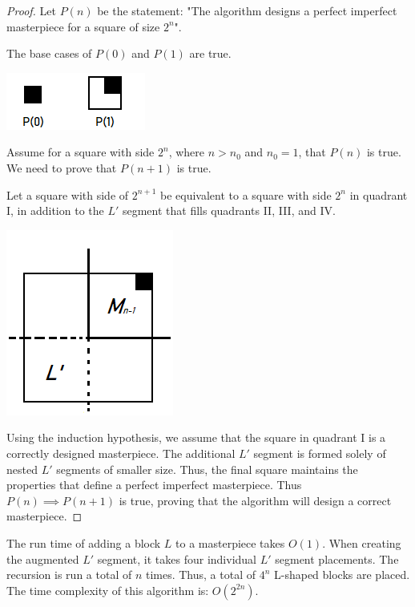 \documentclass[11pt]{article}
\theoremstyle{definition}
\theoremstyle{plain}
\theoremstyle{indented-remark}
\theoremstyle{indented-proof}
\begin{document}
\begin{proof}
Let $P(n)$ be the statement: "The algorithm designs a perfect imperfect masterpiece for a square of size $2^n$". \newline

\noindent The base cases of $P(0)$ and $P(1)$ are true.

\centerline{\includegraphics[scale=1]{images/fig4.png}}

\noindent Assume for a square with side $2^n$, where $n > n_{0}$ and $n_{0} = 1$, that $P(n)$ is true. We need to prove that $P(n + 1)$ is true. \newline

\noindent Let a square with side of $2^{n + 1}$ be equivalent to a square with side $2^n$ in quadrant I, in addition to the $L'$ segment that fills quadrants II, III, and IV. 

\centerline{\includegraphics[scale=1]{images/fig5.png}}

\noindent Using the induction hypothesis, we assume that the square in quadrant I is a correctly designed masterpiece. The additional $L'$ segment is formed solely of nested $L'$ segments of smaller size. Thus, the final square maintains the properties that define a perfect imperfect masterpiece. Thus $P(n) \implies P(n + 1)$ is true, proving that the algorithm will design a correct masterpiece.
\end{proof}

\noindent The run time of adding a block $L$ to a masterpiece takes $O(1)$. When creating the augmented $L'$ segment, it takes four individual $L'$ segment placements. The recursion is run a total of $n$ times. Thus, a total of $4^n$ L-shaped blocks are placed. The time complexity of this algorithm is: $O(2^{2n})$.
\end{document}
